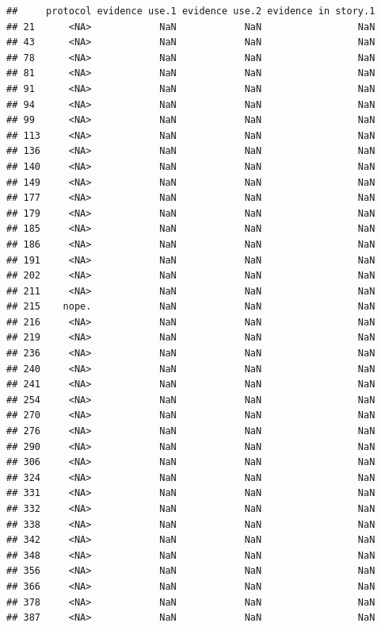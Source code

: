\documentclass[
]{article}
\begin{document}
\begin{verbatim}
##     protocol evidence use.1 evidence use.2 evidence in story.1
## 21      <NA>            NaN            NaN                 NaN
## 43      <NA>            NaN            NaN                 NaN
## 78      <NA>            NaN            NaN                 NaN
## 81      <NA>            NaN            NaN                 NaN
## 91      <NA>            NaN            NaN                 NaN
## 94      <NA>            NaN            NaN                 NaN
## 99      <NA>            NaN            NaN                 NaN
## 113     <NA>            NaN            NaN                 NaN
## 136     <NA>            NaN            NaN                 NaN
## 140     <NA>            NaN            NaN                 NaN
## 149     <NA>            NaN            NaN                 NaN
## 177     <NA>            NaN            NaN                 NaN
## 179     <NA>            NaN            NaN                 NaN
## 185     <NA>            NaN            NaN                 NaN
## 186     <NA>            NaN            NaN                 NaN
## 191     <NA>            NaN            NaN                 NaN
## 202     <NA>            NaN            NaN                 NaN
## 211     <NA>            NaN            NaN                 NaN
## 215    nope.            NaN            NaN                 NaN
## 216     <NA>            NaN            NaN                 NaN
## 219     <NA>            NaN            NaN                 NaN
## 236     <NA>            NaN            NaN                 NaN
## 240     <NA>            NaN            NaN                 NaN
## 241     <NA>            NaN            NaN                 NaN
## 254     <NA>            NaN            NaN                 NaN
## 270     <NA>            NaN            NaN                 NaN
## 276     <NA>            NaN            NaN                 NaN
## 290     <NA>            NaN            NaN                 NaN
## 306     <NA>            NaN            NaN                 NaN
## 324     <NA>            NaN            NaN                 NaN
## 331     <NA>            NaN            NaN                 NaN
## 332     <NA>            NaN            NaN                 NaN
## 338     <NA>            NaN            NaN                 NaN
## 342     <NA>            NaN            NaN                 NaN
## 348     <NA>            NaN            NaN                 NaN
## 356     <NA>            NaN            NaN                 NaN
## 366     <NA>            NaN            NaN                 NaN
## 378     <NA>            NaN            NaN                 NaN
## 387     <NA>            NaN            NaN                 NaN

\end{verbatim}
\end{document}
